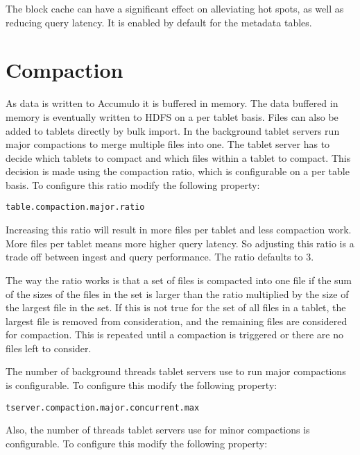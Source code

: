 The block cache can have a significant effect on alleviating hot spots, as well as reducing query latency.
It is enabled by default for the metadata tables.

\section{Compaction}

As data is written to Accumulo it is buffered in memory. The data buffered in
memory is eventually written to HDFS on a per tablet basis. Files can also be
added to tablets directly by bulk import. In the background tablet servers run
major compactions to merge multiple files into one. The tablet server has to
decide which tablets to compact and which files within a tablet to compact.
This decision is made using the compaction ratio, which is configurable on a
per table basis. To configure this ratio modify the following property:

\begingroup\fontsize{8pt}{8pt}\selectfont\begin{verbatim}
table.compaction.major.ratio
\end{verbatim}\endgroup

Increasing this ratio will result in more files per tablet and less compaction
work. More files per tablet means more higher query latency. So adjusting
this ratio is a trade off between ingest and query performance. The ratio
defaults to 3. 

The way the ratio works is that a set of files is compacted into one file if the
sum of the sizes of the files in the set is larger than the ratio multiplied by
the size of the largest file in the set. If this is not true for the set of all
files in a tablet, the largest file is removed from consideration, and the
remaining files are considered for compaction. This is repeated until a
compaction is triggered or there are no files left to consider.

The number of background threads tablet servers use to run major compactions is
configurable. To configure this modify the following property:

\begingroup\fontsize{8pt}{8pt}\selectfont\begin{verbatim}
tserver.compaction.major.concurrent.max
\end{verbatim}\endgroup

Also, the number of threads tablet servers use for minor compactions is
configurable. To configure this modify the following property:

